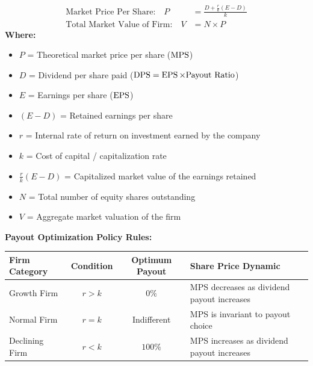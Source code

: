 \begin{formulabox}
\begin{align*}
    \text{Market Price Per Share:} \quad P &= \frac{D + \frac{r}{k}(E - D)}{k} \\[4pt]
    \text{Total Market Value of Firm:} \quad V &= N \times P
\end{align*}
\textbf{Where:}
\begin{itemize}[noitemsep, topsep=2pt]
    \item $P$ = Theoretical market price per share ($\operatorname{MPS}$)
    \item $D$ = Dividend per share paid ($\operatorname{DPS} = \operatorname{EPS} \times \text{Payout Ratio}$)
    \item $E$ = Earnings per share ($\operatorname{EPS}$)
    \item $(E - D)$ = Retained earnings per share
    \item $r$ = Internal rate of return on investment earned by the company
    \item $k$ = Cost of capital / capitalization rate
    \item $\frac{r}{k}(E - D)$ = Capitalized market value of the earnings retained
    \item $N$ = Total number of equity shares outstanding
    \item $V$ = Aggregate market valuation of the firm
\end{itemize}
\vspace{0.4em}
\textbf{Payout Optimization Policy Rules:}
\begin{center}
\small
\begin{tabularx}{\linewidth}{l c c X}
    \toprule
    \textbf{Firm Category} & \textbf{Condition} & \textbf{Optimum Payout} & \textbf{Share Price Dynamic} \\
    \midrule
    Growth Firm & $r > k$ & $0\%$ & MPS decreases as dividend payout increases \\
    Normal Firm & $r = k$ & Indifferent & MPS is invariant to payout choice \\
    Declining Firm & $r < k$ & $100\%$ & MPS increases as dividend payout increases \\
    \bottomrule
\end{tabularx}
\end{center}
\end{formulabox}

